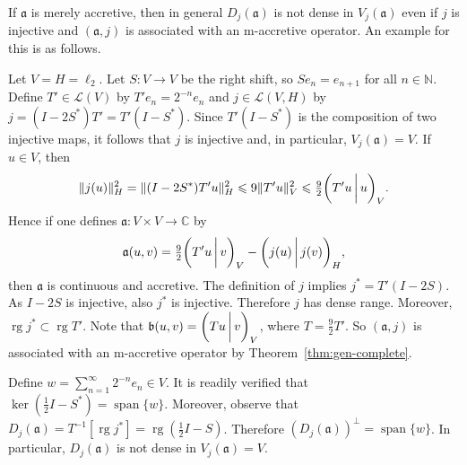 \documentclass[a4paper,oneside,12pt]{amsart}
\theoremstyle{plain}
\theoremstyle{definition}
\newenvironment{example}
{\pushQED{\qed}

\examplex}
{\popQED\endexamplex}
\let\le=\leqslant
\DeclarePairedDelimiter\norm{\lVert}{\rVert}
\begin{document}
If ${{\mathfrak{{a}}}}$ is merely accretive, then in general $D_j({{\mathfrak{{a}}}})$ is not dense in $V_j({{\mathfrak{{a}}}})$
even if $j$ is injective and $({{\mathfrak{{a}}}},j)$ is associated with an {\ensuremath{\text{m}}}-accretive operator.
An example for this is as follows.
\begin{example}
Let $V=H=\ell_2$. Let $S\colon V\to V$ be the right shift, so $Se_n=e_{n+1}$ for all $n\in{\mathbb{N}}$.
Define $T'\in{\mathcal{L}}(V)$ by $T'e_n=2^{-n}e_n$ and $j\in{\mathcal{L}}(V,H)$ by $j=(I-2S^*)T'=T'(I-S^*)$.
Since $T'(I-S^*)$ is the composition of two injective maps, 
it follows that $j$ is injective and, in particular, $V_j({{\mathfrak{{a}}}})=V$.
If $u\in V$, then
\[
    \norm{j(u)}_H^2 = \norm{(I-2S^*)T'u}_H^2\le 9\norm{T'u}_V^2\le\tfrac{9}{2}{{\ifthenelse{\equal{auto}{auto}}{\left({T'u}\mkern3mu{\biggm|}\mkern3mu {u}\right)}{}
\ifthenelse{\equal{auto}{b}}{\bigl({T'u}\mkern3mu{\biggm|}\mkern3mu {u}\bigr)}{}
\ifthenelse{\equal{auto}{B}}{\Bigl({T'u}\mkern3mu{\bigm|}\mkern3mu {u}\Bigr)}{}
}}_V.
\]
Hence if one defines ${{\mathfrak{{a}}}}\colon V\times V\to{\mathbb{C}}$ by
\[
    {{\mathfrak{{a}}}}(u,v)=\tfrac{9}{2}{{\ifthenelse{\equal{auto}{auto}}{\left({T'u}\mkern3mu{\biggm|}\mkern3mu {v}\right)}{}
\ifthenelse{\equal{auto}{b}}{\bigl({T'u}\mkern3mu{\biggm|}\mkern3mu {v}\bigr)}{}
\ifthenelse{\equal{auto}{B}}{\Bigl({T'u}\mkern3mu{\bigm|}\mkern3mu {v}\Bigr)}{}
}}_V-{{\ifthenelse{\equal{auto}{auto}}{\left({j(u)}\mkern3mu{\biggm|}\mkern3mu {j(v)}\right)}{}
\ifthenelse{\equal{auto}{b}}{\bigl({j(u)}\mkern3mu{\biggm|}\mkern3mu {j(v)}\bigr)}{}
\ifthenelse{\equal{auto}{B}}{\Bigl({j(u)}\mkern3mu{\bigm|}\mkern3mu {j(v)}\Bigr)}{}
}}_H,
\]
then ${{\mathfrak{{a}}}}$ is continuous and accretive.
The definition of $j$ implies $j^*=T'(I-2S)$.
As $I-2S$ is injective, also $j^*$ is injective. Therefore $j$ has dense range. 
Moreover, $\operatorname{rg} j^*\subset\operatorname{rg} T'$.
Note that ${{\mathfrak{{b}}}}(u,v)={{\ifthenelse{\equal{auto}{auto}}{\left({Tu}\mkern3mu{\biggm|}\mkern3mu {v}\right)}{}
\ifthenelse{\equal{auto}{b}}{\bigl({Tu}\mkern3mu{\biggm|}\mkern3mu {v}\bigr)}{}
\ifthenelse{\equal{auto}{B}}{\Bigl({Tu}\mkern3mu{\bigm|}\mkern3mu {v}\Bigr)}{}
}}_V$, where $T=\frac{9}{2}T'$.
So $({{\mathfrak{{a}}}},j)$ is associated with an {\ensuremath{\text{m}}}-accretive operator by Theorem~\ref{thm:gen-complete}.

Define $w=\sum_{n=1}^\infty 2^{-n}e_n\in V$. 
It is readily verified that $\ker(\tfrac{1}{2}I-S^*)=\operatorname{span}\{w\}$.
Moreover, observe that $D_j({{\mathfrak{{a}}}})=T^{-1}[\operatorname{rg} j^*]=\operatorname{rg}(\tfrac{1}{2}I-S)$.
Therefore $(D_j({{\mathfrak{{a}}}}))^\perp=\operatorname{span}\{w\}$. In particular, $D_j({{\mathfrak{{a}}}})$ is not dense in $V_j({{\mathfrak{{a}}}})=V$.


\end{example}
\end{document}
